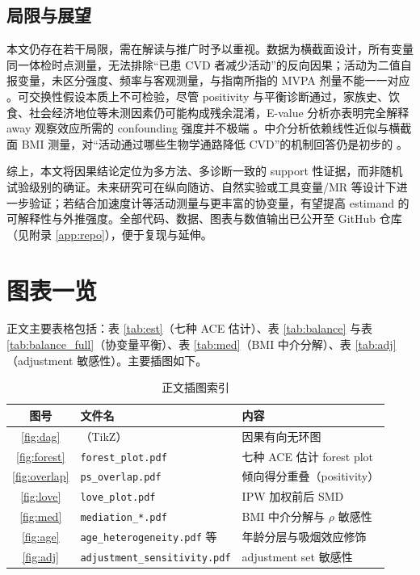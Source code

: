 \documentclass[12pt,a4paper]{article}
\begin{document}
\subsection{局限与展望}

本文仍存在若干局限，需在解读与推广时予以重视。数据为横截面设计，所有变量同一体检时点测量，无法排除“已患 CVD 者减少活动”的反向因果；活动为二值自报变量，未区分强度、频率与客观测量，与指南所指的 MVPA 剂量不能一一对应 \cite{mi2025creview}。可交换性假设本质上不可检验，尽管 positivity 与平衡诊断通过，家族史、饮食、社会经济地位等未测因素仍可能构成残余混淆，E-value 分析亦表明完全解释 away 观察效应所需的 confounding 强度并不极端 \cite{vanderweele2017evalue,hernan2024whatif}。中介分析依赖线性近似与横截面 BMI 测量，对“活动通过哪些生物学通路降低 CVD”的机制回答仍是初步的 \cite{vanderweele2015explanation}。

综上，本文将因果结论定位为多方法、多诊断一致的 support 性证据，而非随机试验级别的确证。未来研究可在纵向随访、自然实验或工具变量/MR 等设计下进一步验证；若结合加速度计等活动测量与更丰富的协变量，有望提高 estimand 的可解释性与外推强度。全部代码、数据、图表与数值输出已公开至 GitHub 仓库（见附录 \ref{app:repo}），便于复现与延伸。

\appendix

\section{图表一览}
\label{app:figures}

正文主要表格包括：表 \ref{tab:est}（七种 ACE 估计）、表 \ref{tab:balance} 与表 \ref{tab:balance_full}（协变量平衡）、表 \ref{tab:med}（BMI 中介分解）、表 \ref{tab:adj}（adjustment 敏感性）。主要插图如下。

\begin{table}[H]
\centering
\caption{正文插图索引}
\label{tab:figindex}
\begin{tabular}{clp{7.5cm}}
\toprule
图号 & 文件名 & 内容 \\
\midrule
\ref{fig:dag}   & （TikZ）       & 因果有向无环图 \\
\ref{fig:forest} & \texttt{forest\_plot.pdf} & 七种 ACE 估计 forest plot \\
\ref{fig:overlap} & \texttt{ps\_overlap.pdf} & 倾向得分重叠（positivity） \\
\ref{fig:love}   & \texttt{love\_plot.pdf} & IPW 加权前后 SMD \\
\ref{fig:med}    & \texttt{mediation\_*.pdf} & BMI 中介分解与 $\rho$ 敏感性 \\
\ref{fig:age}    & \texttt{age\_heterogeneity.pdf} 等 & 年龄分层与吸烟效应修饰 \\
\ref{fig:adj}    & \texttt{adjustment\_sensitivity.pdf} & adjustment set 敏感性 \\
\bottomrule
\end{tabular}
\end{table}
\end{document}
